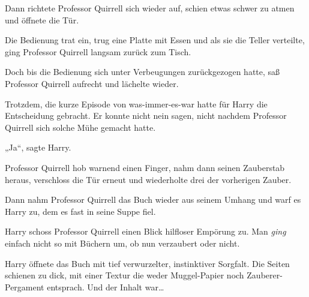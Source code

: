 Dann richtete Professor Quirrell sich wieder auf, schien etwas schwer zu atmen und öffnete die Tür.

Die Bedienung trat ein, trug eine Platte mit Essen und als sie die Teller verteilte, ging Professor Quirrell langsam zurück zum Tisch.

Doch bis die Bedienung sich unter Verbeugungen zurückgezogen hatte, saß Professor Quirrell aufrecht und lächelte wieder.

Trotzdem, die kurze Episode von was-immer-es-war hatte für Harry die Entscheidung gebracht. Er konnte nicht nein sagen, nicht nachdem Professor Quirrell sich solche Mühe gemacht hatte.

„Ja“, sagte Harry.

Professor Quirrell hob warnend einen Finger, nahm dann seinen Zauberstab heraus, verschloss die Tür erneut und wiederholte drei der vorherigen Zauber.

Dann nahm Professor Quirrell das Buch wieder aus seinem Umhang und warf es Harry zu, dem es fast in seine Suppe fiel.

Harry schoss Professor Quirrell einen Blick hilfloser Empörung zu. Man \emph{ging} einfach nicht so mit Büchern um, ob nun verzaubert oder nicht.

Harry öffnete das Buch mit tief verwurzelter, instinktiver Sorgfalt. Die Seiten schienen zu dick, mit einer Textur die weder Muggel-Papier noch Zauberer-Pergament entsprach. Und der Inhalt war…

